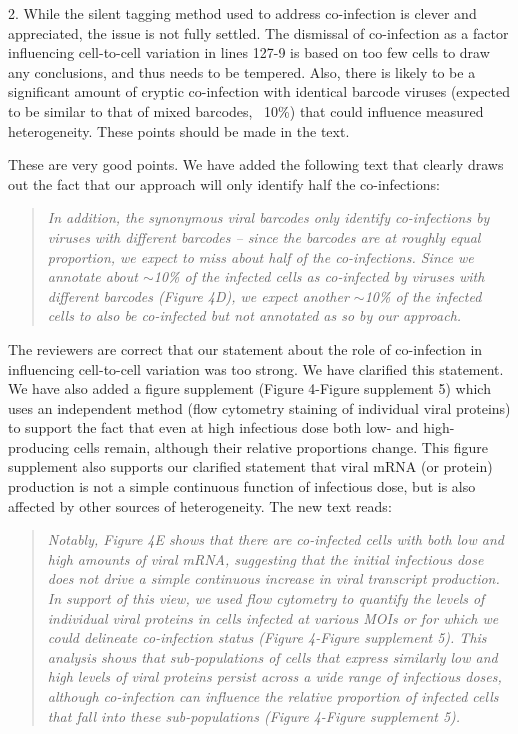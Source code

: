 \documentclass[11pt, oneside]{article}   	%
\begin{document}
2. While the silent tagging method used to address co-infection is clever and appreciated, the issue is not fully settled. The dismissal of co-infection as a factor influencing cell-to-cell variation in lines 127-9 is based on too few cells to draw any conclusions, and thus needs to be tempered. Also, there is likely to be a significant amount of cryptic co-infection with identical barcode viruses (expected to be similar to that of mixed barcodes, ~10\%) that could influence measured heterogeneity. These points should be made in the text. 

{\color{black}
These are very good points.
We have added the following text that clearly draws out the fact that our approach will only identify half the co-infections:
\begin{quote}
\textsl{
In addition, the synonymous viral barcodes only identify co-infections by viruses with different barcodes -- since the barcodes are at roughly equal proportion, we expect to miss about half of the co-infections.
Since we annotate about $\sim$10\% of the infected cells as co-infected by viruses with different barcodes (Figure 4D), we expect another $\sim$10\% of the infected cells to also be co-infected but not annotated as so by our approach.
}
\end{quote}

The reviewers are correct that our statement about the role of co-infection in influencing cell-to-cell variation was too strong.
We have clarified this statement.
We have also added a figure supplement (Figure 4-Figure supplement 5) which uses an independent method (flow cytometry staining of individual viral proteins) to support the fact that even at high infectious dose both low- and high-producing cells remain, although their relative proportions change.
This figure supplement also supports our clarified statement that viral mRNA (or protein) production is not a simple continuous function of infectious dose, but is also affected by other sources of heterogeneity.
The new text reads:
\begin{quote}
\textsl{
Notably, Figure 4E shows that there are co-infected cells with both low and high amounts of viral mRNA, suggesting that the initial infectious dose does not drive a simple continuous increase in viral transcript production.
In support of this view, we used flow cytometry to quantify the levels of individual viral proteins in cells infected at various MOIs or for which we could delineate co-infection status (Figure 4-Figure supplement 5).
This analysis shows that sub-populations of cells that express similarly low and high levels of viral proteins persist across a wide range of infectious doses, although co-infection can influence the relative proportion of infected cells that fall into these sub-populations (Figure 4-Figure supplement 5).
}
\end{quote}
}
\end{document}
